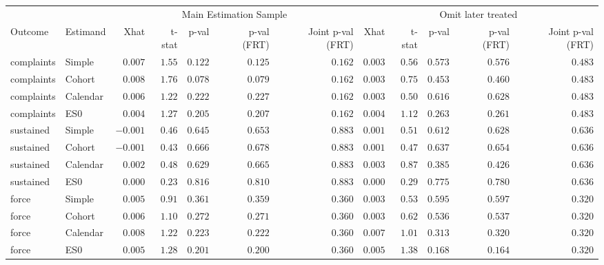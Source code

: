 \begin{longtable}{llrrrrrrrrrr}
\toprule
 &  & \multicolumn{5}{c}{Main Estimation Sample} & \multicolumn{5}{c}{Omit later treated} \\ 
\cmidrule(lr){3-7} \cmidrule(lr){8-12}
Outcome & Estimand & Xhat & t-stat & p-val & p-val (FRT) & Joint p-val 
(FRT) & Xhat & t-stat & p-val & p-val (FRT) & Joint p-val 
(FRT) \\ 
\midrule
complaints & Simple & $0.007$ & $1.55$ & $0.122$ & $0.125$ & $0.162$ & $0.003$ & $0.56$ & $0.573$ & $0.576$ & $0.483$ \\ 
complaints & Cohort & $0.008$ & $1.76$ & $0.078$ & $0.079$ & $0.162$ & $0.003$ & $0.75$ & $0.453$ & $0.460$ & $0.483$ \\ 
complaints & Calendar & $0.006$ & $1.22$ & $0.222$ & $0.227$ & $0.162$ & $0.003$ & $0.50$ & $0.616$ & $0.628$ & $0.483$ \\ 
complaints & ES0 & $0.004$ & $1.27$ & $0.205$ & $0.207$ & $0.162$ & $0.004$ & $1.12$ & $0.263$ & $0.261$ & $0.483$ \\ 
sustained & Simple & $-0.001$ & $0.46$ & $0.645$ & $0.653$ & $0.883$ & $0.001$ & $0.51$ & $0.612$ & $0.628$ & $0.636$ \\ 
sustained & Cohort & $-0.001$ & $0.43$ & $0.666$ & $0.678$ & $0.883$ & $0.001$ & $0.47$ & $0.637$ & $0.654$ & $0.636$ \\ 
sustained & Calendar & $0.002$ & $0.48$ & $0.629$ & $0.665$ & $0.883$ & $0.003$ & $0.87$ & $0.385$ & $0.426$ & $0.636$ \\ 
sustained & ES0 & $0.000$ & $0.23$ & $0.816$ & $0.810$ & $0.883$ & $0.000$ & $0.29$ & $0.775$ & $0.780$ & $0.636$ \\ 
force & Simple & $0.005$ & $0.91$ & $0.361$ & $0.359$ & $0.360$ & $0.003$ & $0.53$ & $0.595$ & $0.597$ & $0.320$ \\ 
force & Cohort & $0.006$ & $1.10$ & $0.272$ & $0.271$ & $0.360$ & $0.003$ & $0.62$ & $0.536$ & $0.537$ & $0.320$ \\ 
force & Calendar & $0.008$ & $1.22$ & $0.223$ & $0.222$ & $0.360$ & $0.007$ & $1.01$ & $0.313$ & $0.320$ & $0.320$ \\ 
force & ES0 & $0.005$ & $1.28$ & $0.201$ & $0.200$ & $0.360$ & $0.005$ & $1.38$ & $0.168$ & $0.164$ & $0.320$ \\ 
\bottomrule
\end{longtable}

